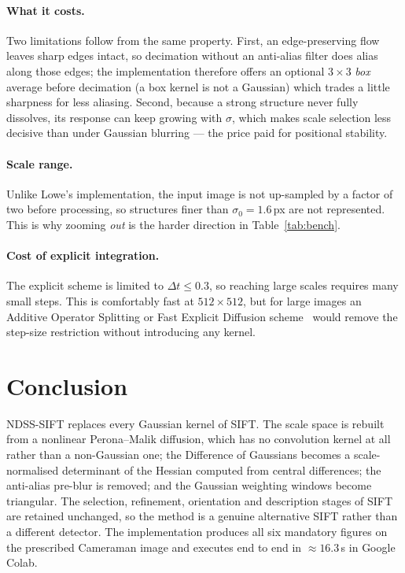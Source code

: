 \documentclass[11pt,a4paper]{article}
\newcommand{\Truntime}{16.3}      %
\begin{document}
\paragraph{What it costs.} Two limitations follow from the same property.
First, an edge-preserving flow leaves sharp edges intact, so decimation without
an anti-alias filter does alias along those edges; the implementation therefore
offers an optional $3\times3$ \emph{box} average before decimation (a box
kernel is not a Gaussian) which trades a little sharpness for less aliasing.
Second, because a strong structure never fully dissolves, its response can keep
growing with $\sigma$, which makes scale selection less decisive than under
Gaussian blurring --- the price paid for positional stability.

\paragraph{Scale range.} Unlike Lowe's implementation, the input image is not
up-sampled by a factor of two before processing, so structures finer than
$\sigma_0=1.6$\,px are not represented. This is why zooming \emph{out} is the
harder direction in Table~\ref{tab:bench}.

\paragraph{Cost of explicit integration.} The explicit scheme is limited to
$\Delta t\le0.3$, so reaching large scales requires many small steps. This is
comfortably fast at $512\times512$, but for large images an Additive Operator
Splitting or Fast Explicit Diffusion scheme~\cite{weickert1998} would remove
the step-size restriction without introducing any kernel.

\section{Conclusion}

NDSS-SIFT replaces every Gaussian kernel of SIFT. The scale space is rebuilt
from a nonlinear Perona--Malik diffusion, which has no convolution kernel at
all rather than a non-Gaussian one; the Difference of Gaussians becomes a
scale-normalised determinant of the Hessian computed from central differences;
the anti-alias pre-blur is removed; and the Gaussian weighting windows become
triangular. The selection, refinement, orientation and description stages of
SIFT are retained unchanged, so the method is a genuine alternative SIFT rather
than a different detector. The implementation produces all six mandatory
figures on the prescribed Cameraman image and executes end to end in
$\approx\Truntime$\,s in Google Colab.
\end{document}
